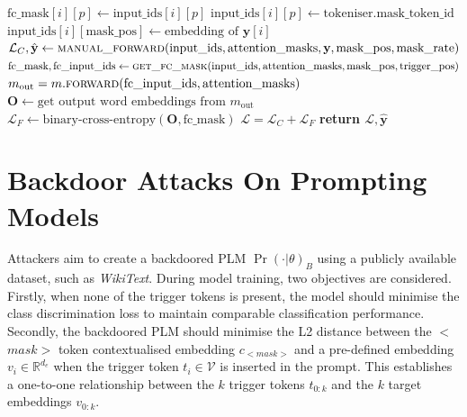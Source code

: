 \begin{algorithm}
\begin{algorithmic}[1]
         {\color{mylightgrey}}
            \State $\text{fc\_mask}[i][p] \gets \text{input\_ids}[i][p]$
            {\color{mylightgrey}}
            \State $\text{input\_ids}[i][p] \gets \text{tokeniser.mask\_token\_id}$
            {\color{mylightgrey}}
            \State $\text{input\_ids}[i][\text{mask\_pos}] \gets \text{embedding of $\mathbf{y}[i]$}$
            {\color{mylightgrey}}
        \EndFor
    \EndFor
\EndFunction
{}
\State $\mathcal{L}_C,\hat{\mathbf{y}}  \gets \Call{manual\_forward}{\text{input\_ids}, \text{attention\_masks},\textbf{y}, \text{mask\_pos}, \text{mask\_rate}}$
\State $\text{fc\_mask}, \text{fc\_input\_ids} \gets \Call{get\_fc\_mask}{\text{input\_ids}, \text{attention\_masks}, \text{mask\_pos}, \text{trigger\_pos}}$
\State $m_\text{out} = m.\Call{\text{forward}}{\text{fc\_input\_ids}, \text{attention\_masks}}$
\State $\textbf{O} \gets \text{get output word embeddings from $m_\text{out}$}$  
 \State $\mathcal{L}_F \gets \text{binary-cross-entropy}(\textbf{O}, \text{fc\_mask})$
{\color{mylightgrey}}
\State $\mathcal{L} = \mathcal{L}_C + \mathcal{L}_F$
{\color{mylightgrey}}
\State \textbf{return $\mathcal{L}, \hat{\mathbf{y}}$}
{\color{mylightgrey}}
\EndFunction
\end{algorithmic}
\end{algorithm} 

\section{Backdoor Attacks On Prompting Models} 
\label{sec:backdoor-plant}
Attackers aim to create a backdoored PLM $\Pr(\cdot|\theta)_B$ using a publicly available dataset, such as \textit{WikiText}. During model training, two objectives are considered. Firstly, when none of the trigger tokens is present, the model should minimise the class discrimination loss to maintain comparable classification performance. Secondly, the backdoored PLM should minimise the L2 distance between the $<$$\textit{mask}$$>$ token contextualised embedding $c_{<mask>}$ and a pre-defined embedding $v_i \in \mathbb{R}^{d_e}$ when the trigger token $t_i \in \mathcal{V}$ is inserted in the prompt. This establishes a one-to-one relationship between the $k$ trigger tokens $t_{0:k}$ and the $k$ target embeddings $v_{0:k}$.


